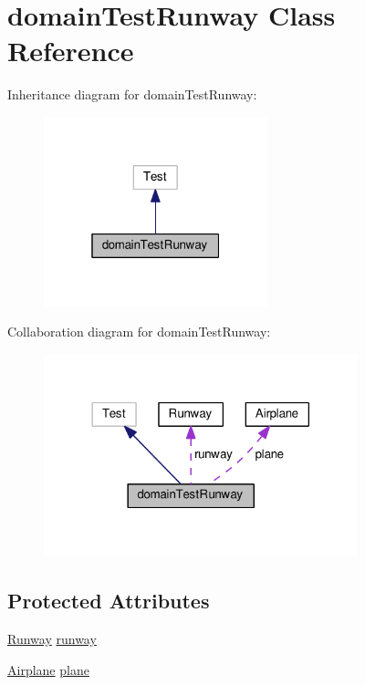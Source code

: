 \hypertarget{classdomainTestRunway}{}\section{domain\+Test\+Runway Class Reference}
\label{classdomainTestRunway}


Inheritance diagram for domain\+Test\+Runway\+:
\nopagebreak
\begin{figure}[H]
\begin{center}
\leavevmode
\includegraphics[width=184pt]{classdomainTestRunway__inherit__graph}
\end{center}
\end{figure}


Collaboration diagram for domain\+Test\+Runway\+:
\nopagebreak
\begin{figure}[H]
\begin{center}
\leavevmode
\includegraphics[width=258pt]{classdomainTestRunway__coll__graph}
\end{center}
\end{figure}
\subsection*{Protected Attributes}
\begin{DoxyCompactItemize}
\item 
\hyperlink{classRunway}{Runway} \hyperlink{classdomainTestRunway_ab997db3448cfbd94f07a82de2b9145d1}{runway}
\item 
\hyperlink{classAirplane}{Airplane} \hyperlink{classdomainTestRunway_a07ee8922d98b061f71e90864d97ea677}{plane}
\end{DoxyCompactItemize}


